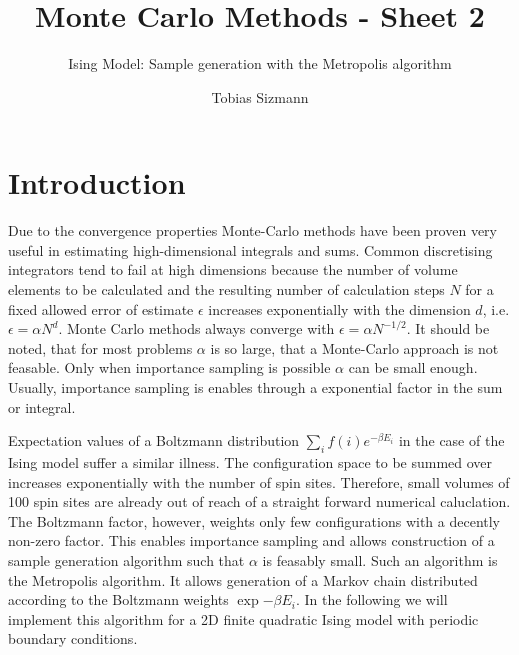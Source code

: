 \documentclass[11pt, a4paper]{scrartcl}
\title{Monte Carlo Methods - Sheet 2}
\subtitle{Ising Model: Sample generation with the Metropolis algorithm}
\author{Tobias Sizmann}
\begin{document}
\maketitle
\section{Introduction}
Due to the convergence properties Monte-Carlo methods have been proven very useful in estimating high-dimensional integrals and sums. Common discretising integrators tend to fail at high dimensions because the number of volume elements to be calculated and the resulting number of calculation steps $N$ for a fixed allowed error of estimate $\epsilon$ increases exponentially with the dimension $d$, i.e. $\epsilon = \alpha N^d$. Monte Carlo methods always converge with $\epsilon = \alpha N^{-1/2}$. It should be noted, that for most problems $\alpha$ is so large, that a Monte-Carlo approach is not feasable. Only when importance sampling is possible $\alpha$ can be small enough. Usually, importance sampling is enables through a exponential factor in the sum or integral.

Expectation values of a Boltzmann distribution $\sum_i f(i) e^{-\beta E_i}$ in the case of the Ising model suffer a similar illness. The configuration space to be summed over increases exponentially with the number of spin sites. Therefore, small volumes of 100 spin sites are already out of reach of a straight forward numerical caluclation. The Boltzmann factor, however, weights only few configurations with a decently non-zero factor. This enables importance sampling and allows construction of a sample generation algorithm such that $\alpha$ is feasably small. Such an algorithm is the Metropolis algorithm. It allows generation of a Markov chain distributed according to the Boltzmann weights $\exp{-\beta E_i}$. In the following we will implement this algorithm for a 2D finite quadratic Ising model with periodic boundary conditions.
\end{document}
